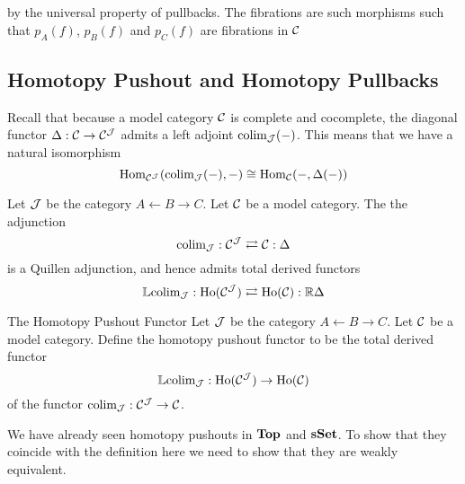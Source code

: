 \documentclass[a4paper]{article}
\begin{document}
\begin{prp}{}{}
\begin{itemize}
\\~\\
by the universal property of pullbacks. The fibrations are such morphisms such that $p_A(f)$, $p_B(f)$ and $p_C(f)$ are fibrations in $\mathcal{C}$
\end{itemize}
\end{prp}

\subsection{Homotopy Pushout and Homotopy Pullbacks}
Recall that because a model category $\mathcal{C}$ is complete and cocomplete, the diagonal functor $\Delta:\mathcal{C}\to\mathcal{C}^{\mathcal{J}}$ admits a left adjoint $\text{colim}_{\mathcal{J}}(-)$. This means that we have a natural isomorphism $$\operatorname{Hom}_{\mathcal{C}^{\mathcal{J}}}(\text{colim}_{\mathcal{J}}(-),-)\cong\operatorname{Hom}_{\mathcal{C}}(-,\Delta(-))$$

\begin{prp}{}{} Let $\mathcal{J}$ be the category $A\leftarrow B\rightarrow C$. Let $\mathcal{C}$ be a model category. The the adjunction $$\text{colim}_{\mathcal{J}}:\mathcal{C}^{\mathcal{J}}\rightleftarrows\mathcal{C}:\Delta$$ is a Quillen adjunction, and hence admits total derived functors $$\mathbb{L}\text{colim}_{\mathcal{J}}:\text{Ho}(\mathcal{C}^{\mathcal{J}})\rightleftarrows\text{Ho}(\mathcal{C}):\mathbb{R}\Delta$$
\end{prp}

\begin{defn}{The Homotopy Pushout Functor}{} Let $\mathcal{J}$ be the category $A\leftarrow B\rightarrow C$. Let $\mathcal{C}$ be a model category. Define the homotopy pushout functor to be the total derived functor $$\mathbb{L}\text{colim}_{\mathcal{J}}:\text{Ho}(\mathcal{C}^{\mathcal{J}})\to\text{Ho}(\mathcal{C})$$ of the functor $\text{colim}_{\mathcal{J}}:\mathcal{C}^{\mathcal{J}}\to\mathcal{C}$. 
\end{defn}

We have already seen homotopy pushouts in $\bold{Top}$ and $\bold{sSet}$. To show that they coincide with the definition here we need to show that they are weakly equivalent. 
\end{document}
